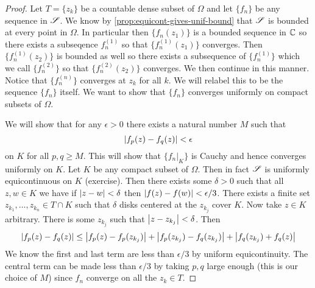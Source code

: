 \begin{proof}
    Let $T = \{z_k\}$ be a countable dense subset of $\Omega$ and let $\{f_n\}$ be any sequence in $\mathscr{S}$. We know by \autoref{prop:equicont-gives-unif-bound} that $\mathscr{S}$ is bounded at every point in $\Omega$. In particular then $\{f_n(z_1)\}$ is a bounded sequence in $\mathbb{C}$ so there exists a subseqence $f_n^{(1)}$ so that $\{f_n^{(1)}(z_1)\}$ converges. Then $\{f_n^{(1)}(z_2)\}$ is bounded as well so there exists a subsequence of $\{f_n^{(1)}\}$ which we call $\{f_n^{(2)}\}$ so that $\{f_n^{(2)}(z_2)\}$ converges. We then continue in this manner. Notice that $\{f_n^{(n)}\}$ converges at $z_k$ for all $k$. We will relabel this to be the sequence $\{f_n\}$ itself. We want to show that $\{f_n\}$ converges uniformly on compact subsets of $\Omega$. 

    We will show that for any $\epsilon > 0$ there exists a natural number $M$ such that 
    $$\left|f_p(z) - f_q(z)\right| < \epsilon$$
    on $K$ for all $p, q \geq M$. This will show that $\{f_n|_K\}$ is Cauchy and hence converges uniformly on $K$. 
    Let $K$ be any compact subset of $\Omega$. Then in fact $\mathscr{S}$ is uniformly equicontinuous on $K$ (exercise). Then there exists some $\delta > 0$ such that all $z, w \in K$ we have if $\left|z - w\right| < \delta$ then $\left|f(z) - f(w)\right| < \epsilon/3$. There exists a finite set $z_{k_1}, \dots, z_{k_n} \in T \cap K$ such that $\delta$ disks centered at the $z_{k_j}$ cover $K$. Now take $z \in K$ arbitrary. There is some $z_{k_j}$ such that $\left|z - z_{k_j}\right| < \delta$. Then 
    \begin{align*}
        \left|f_p(z) - f_q(z)\right| \leq \left|f_p(z) - f_p(z_{k_j})\right| + \left|f_p(z_{k_j}) - f_q(z_{k_j})\right| + \left|f_q(z_{k_j}) + f_{q}(z)\right|
    \end{align*}
    We know the first and last term are less than $\epsilon/3$ by uniform equicontinuity. The central term can be made less than $\epsilon/3$ by taking $p, q$ large enough (this is our choice of $M$) since $f_n$ converge on all the $z_k \in T$.
\end{proof}

